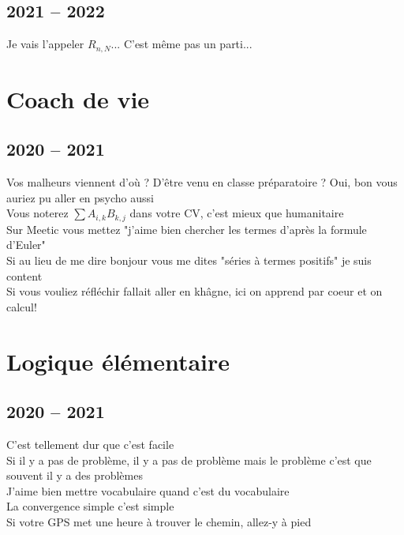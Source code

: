 \documentclass[french, a4paper, openany]{book}
\begin{document}
\section{2021 -- 2022}

	\noindent \og Je vais l'appeler $R_{n,N}$... C'est même pas un parti... \fg \\

\chapter{Coach de vie}

\section{2020 -- 2021}

	\noindent \og Vos malheurs viennent d'où ? D'être venu en classe préparatoire ? Oui, bon vous auriez pu aller en psycho aussi \fg \\
	\og Vous noterez $\sum A_{i,k} B_{k,j}$ dans votre CV, c'est mieux que humanitaire \fg \\
	\og Sur Meetic vous mettez "j'aime bien chercher les termes d'après la formule d'Euler" \fg \\
	\og Si au lieu de me dire bonjour vous me dites "séries à termes positifs" je suis content \fg \\
	\og Si vous vouliez réfléchir fallait aller en khâgne, ici on apprend par coeur et on calcul! \fg \\

\chapter{Logique élémentaire}

\section{2020 -- 2021}

	\noindent \og C'est tellement dur que c'est facile \fg \\
	\og Si il y a pas de problème, il y a pas de problème mais le problème c'est que souvent il y a des problèmes \fg \\
	\og J'aime bien mettre vocabulaire quand c'est du vocabulaire \fg \\
	\og La convergence simple c'est simple \fg \\
	\og Si votre GPS met une heure à trouver le chemin, allez-y à pied \fg \\
\end{document}
